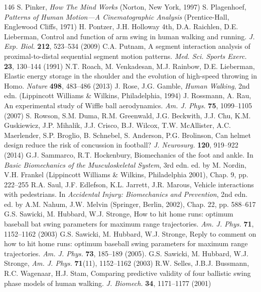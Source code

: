 \documentclass[12pt]{book}
\begin{document}
\begin{thebibliography}{146}
 S. Pinker, \textit{How The Mind Works} (Norton, New York, 1997)
 S. Plagenhoef, \textit{Patterns of Human Motion---A Cinematographic Analysis} (Prentice-Hall, Englewood Cliffs, 1971)
 H. Pontzer, J.H. Holloway 4th, D.A. Raichlen, D.E. Lieberman, Control and function of arm swing in human walking and running. \textit{J. Exp. Biol.} \textbf{212}, 523--534 (2009)
 C.A. Putnam, A segment interaction analysis of proximal-to-distal sequential segment motion patterns. \textit{Med. Sci. Sports Exerc.} \textbf{23}, 130--144 (1991)
 N.T. Roach, M. Venkadesan, M.J. Rainbow, D.E. Lieberman, Elastic energy storage in the shoulder and the evolution of high-speed throwing in Homo. \textit{Nature} \textbf{498}, 483--486 (2013)
 J. Rose, J.G. Gamble, \textit{Human Walking}, 2nd edn. (Lippincott Williams \& Wilkins, Philadelphia, 1994)
 J. Rossmann, A. Rau, An experimental study of Wiffle ball aerodynamics. \textit{Am. J. Phys.} \textbf{75}, 1099--1105 (2007)
 S. Rowson, S.M. Duma, R.M. Greenwald, J.G. Beckwith, J.J. Chu, K.M. Guskiewicz, J.P. Mihalik, J.J. Crisco, B.J. Wilcox, T.W. McAllister, A.C. Maerlender, S.P. Broglio, B. Schnebel, S. Anderson, P.G. Brolinson, Can helmet design reduce the risk of concussion in football? \textit{J. Neurosurg.} \textbf{120}, 919--922 (2014)
 G.J. Sammarco, R.T. Hockenbury, Biomechanics of the foot and ankle. In \textit{Basic Biomechanics of the Musculoskeletal System}, 3rd edn. ed. by M. Nordin, V.H. Frankel (Lippincott Williams \& Wilkins, Philadelphia 2001), Chap. 9, pp. 222--255
 R.A. Saul, J.F. Edlefson, K.L. Jarrett, J.R. Marous, Vehicle interactions with pedestrians. In \textit{Accidental Injury: Biomechanics and Prevention}, 2nd edn. ed. by A.M. Nahum, J.W. Melvin (Springer, Berlin, 2002), Chap. 22, pp. 588--617
 G.S. Sawicki, M. Hubbard, W.J. Stronge, How to hit home runs: optimum baseball bat swing parameters for maximum range trajectories. \textit{Am. J. Phys.} \textbf{71}, 1152--1162 (2003)
 G.S. Sawicki, M. Hubbard, W.J. Stronge, Reply to comment on how to hit home runs: optimum baseball swing parameters for maximum range trajectories. \textit{Am. J. Phys.} \textbf{73}, 185--189 (2005). G.S. Sawicki, M. Hubbard, W.J. Stronge, \textit{Am. J. Phys.} \textbf{71}(11), 1152--1162 (2003)
 R.W. Selles, J.B.J. Bussmann, R.C. Wagenaar, H.J. Stam, Comparing predictive validity of four ballistic swing phase models of human walking. \textit{J. Biomech.} \textbf{34}, 1171--1177 (2001)

\end{thebibliography}
\end{document}
